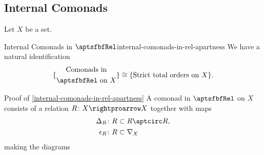 \subsection{Internal Comonads}\label{subsection-internal-comonads-in-rel-apartness}
Let $X$ be a set.
\begin{proposition}{Internal Comonads in $\aptsfbfRel$}{internal-comonads-in-rel-apartness}%
    We have a natural identification%
    \[
        \{
            \begin{gathered}
                \text{Comonads in}\\
                \text{$\aptsfbfRel$ on $X$}
            \end{gathered}
        \}
        \cong
        \{\text{Strict total orders on $X$}\}.
    \]%
\end{proposition}
\begin{Proof}{Proof of \cref{internal-comonads-in-rel-apartness}}%
    A comonad in $\aptsfbfRel$ on $X$ consists of a relation $R\colon X\rightproarrow X$ together with maps
    \begin{align*}
        \Delta_{R}   &\colon R \subset R\aptcirc R,\\
        \epsilon_{R} &\colon R \subset \nabla_{X}
    \end{align*}
    making the diagrams
    \begingroup\footnotesize%
    \begin{webcompile}
\end{webcompile}
\end{Proof}
